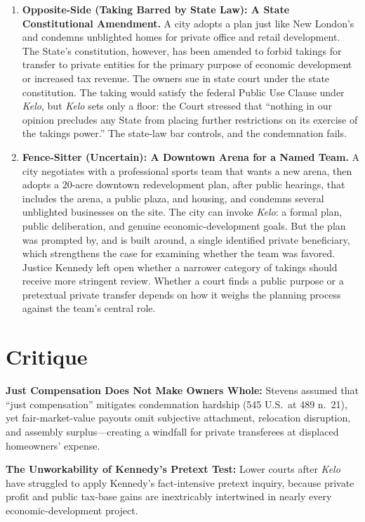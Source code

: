 \documentclass[12pt]{article}
\begin{document}
\begin{enumerate}
\item \textbf{Opposite-Side (Taking Barred by State Law): A State Constitutional Amendment.} A city adopts a plan just like New London's and condemns unblighted homes for private office and retail development. The State's constitution, however, has been amended to forbid takings for transfer to private entities for the primary purpose of economic development or increased tax revenue. The owners sue in state court under the state constitution. The taking would satisfy the federal Public Use Clause under \textit{Kelo}, but \textit{Kelo} sets only a floor: the Court stressed that ``nothing in our opinion precludes any State from placing further restrictions on its exercise of the takings power.'' The state-law bar controls, and the condemnation fails.

\item \textbf{Fence-Sitter (Uncertain): A Downtown Arena for a Named Team.} A city negotiates with a professional sports team that wants a new arena, then adopts a 20-acre downtown redevelopment plan, after public hearings, that includes the arena, a public plaza, and housing, and condemns several unblighted businesses on the site. The city can invoke \textit{Kelo}: a formal plan, public deliberation, and genuine economic-development goals. But the plan was prompted by, and is built around, a single identified private beneficiary, which strengthens the case for examining whether the team was favored. Justice Kennedy left open whether a narrower category of takings should receive more stringent review. Whether a court finds a public purpose or a pretextual private transfer depends on how it weighs the planning process against the team's central role.

\end{enumerate}

\section{Critique}
\textbf{Just Compensation Does Not Make Owners Whole:} Stevens assumed that ``just compensation'' mitigates condemnation hardship (545 U.S.\ at 489 n.\ 21), yet fair-market-value payouts omit subjective attachment, relocation disruption, and assembly surplus---creating a windfall for private transferees at displaced homeowners' expense.

\textbf{The Unworkability of Kennedy's Pretext Test:} Lower courts after \textit{Kelo} have struggled to apply Kennedy's fact-intensive pretext inquiry, because private profit and public tax-base gains are inextricably intertwined in nearly every economic-development project.
\end{document}
